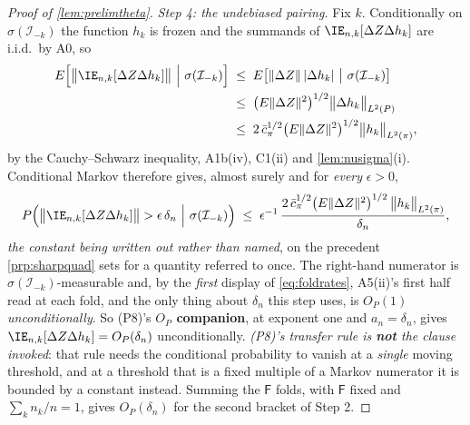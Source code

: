 \begin{proof}[Proof of \cref{lem:prelimtheta}]
\emph{Step 4: the undebiased pairing.} Fix $k$. Conditionally on $\sigma(\mathcal I_{-k})$ the
function $h_k$ is frozen and the summands of $\IE_{n,k}[\Delta Z\Delta h_k]$ are i.i.d.\ by A0, so
\begin{align*}
E\Big[\big\|\IE_{n,k}[\Delta Z\Delta h_k]\big\|\ \Big|\ \sigma(\mathcal I_{-k})\Big]
&\;\le\;E\big[\|\Delta Z\|\,|\Delta h_k|\ \big|\ \sigma(\mathcal I_{-k})\big] \\
&\;\le\;\big(E\|\Delta Z\|^{2}\big)^{1/2}\big\|\Delta h_k\big\|_{L^{2}(P)} \\
&\;\le\;2\,\bar c_\pi^{1/2}\big(E\|\Delta Z\|^{2}\big)^{1/2}\big\|h_k\big\|_{L^{2}(\pi)} ,
\end{align*}
by the Cauchy--Schwarz inequality, A1b(iv), C1(ii) and \cref{lem:nusigma}(i). Conditional Markov therefore
gives, almost surely and for \emph{every} $\epsilon>0$,
\[
P\Big(\big\|\IE_{n,k}[\Delta Z\Delta h_k]\big\|>\epsilon\,\delta_n\ \Big|\ \sigma(\mathcal I_{-k})\Big)
\;\le\;\epsilon^{-1}\,\frac{2\,\bar c_\pi^{1/2}\big(E\|\Delta Z\|^{2}\big)^{1/2}\,\big\|h_k\big\|_{L^{2}(\pi)}}{\delta_n} ,
\]
\emph{the constant being written out rather than named}, on the precedent \cref{prp:sharpquad} sets for a
quantity referred to once. The right-hand numerator is $\sigma(\mathcal I_{-k})$-measurable and, by the
\emph{first} display of \eqref{eq:foldrates}, A5(ii)'s first half read at each fold, and the only thing
about $\delta_n$ this step uses, is $O_P(1)$ \emph{unconditionally}. So \textup{(P8)}'s
\textbf{$O_P$ companion}, at exponent one and $a_n=\delta_n$, gives
$\IE_{n,k}[\Delta Z\Delta h_k]=O_P(\delta_n)$ unconditionally.
\emph{\textup{(P8)}'s \emph{transfer rule} is \textbf{not} the clause invoked}: that rule needs the
conditional probability to vanish at a \emph{single}
moving threshold, and at a threshold that is a fixed multiple of a Markov numerator it is bounded by a
constant instead. Summing the $\mathsf F$ folds, with
$\mathsf F$ fixed and $\sum_kn_k/n=1$, gives $O_P(\delta_n)$ for the second bracket of Step 2.


\end{proof}
